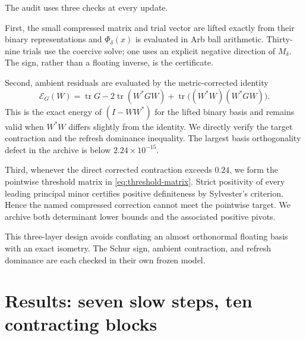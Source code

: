 \documentclass[11pt]{article}
\theoremstyle{definition}
\theoremstyle{remark}
\newcommand{\tr}{\operatorname{tr}}
\newcommand{\E}{\mathcal E}
\begin{document}
The audit uses three checks at every update.

First, the small compressed matrix and trial vector are lifted exactly from
their binary representations and $\Phi_\delta(x)$ is evaluated in Arb ball
arithmetic.  Thirty-nine trials use the coercive solve; one uses an explicit
negative direction of $M_\delta$.  The sign, rather than a floating inverse,
is the certificate.

Second, ambient residuals are evaluated by the metric-corrected identity
\begin{equation}
 \E_G(W)=\tr G-2\tr(W^*GW)
 +\tr\bigl((W^*W)(W^*GW)\bigr).
 \label{eq:metric-corrected}
\end{equation}
This is the exact energy of $(I-WW^*)$ for the lifted binary basis and remains
valid when $W^*W$ differs slightly from the identity.  We directly verify the
target contraction and the refresh dominance inequality.  The largest basis
orthogonality defect in the archive is below $2.24\times10^{-15}$.

Third, whenever the direct corrected contraction exceeds $0.24$, we form the
pointwise threshold matrix in \eqref{eq:threshold-matrix}.  Strict positivity
of every leading principal minor certifies positive definiteness by
Sylvester's criterion.  Hence the named compressed correction cannot meet the
pointwise target.  We archive both determinant lower bounds and the associated
positive pivots.

This three-layer design avoids conflating an almost orthonormal floating basis
with an exact isometry.  The Schur sign, ambient contraction, and refresh
dominance are each checked in their own frozen model.

\section{Results: seven slow steps, ten contracting blocks}
\end{document}
